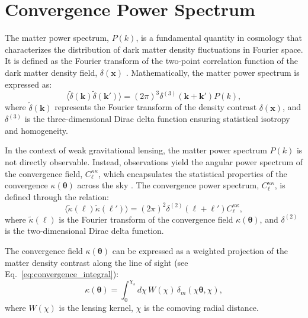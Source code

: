 \section{Convergence Power Spectrum}
The matter power spectrum, \( P(k) \), is a fundamental quantity in cosmology that characterizes the distribution of dark matter density fluctuations in Fourier space. It is defined as the Fourier transform of the two-point correlation function of the dark matter density field, \( \delta(\mathbf{x}) \) \citep{2001PhR...340..291B}. Mathematically, the matter power spectrum is expressed as:
\begin{equation}
    \langle \tilde{\delta}(\mathbf{k}) \tilde{\delta}(\mathbf{k}') \rangle = (2\pi)^3 \delta^{(3)}(\mathbf{k} + \mathbf{k}') P(k),
    \label{eq:matter_power_spectrum}
\end{equation}
where \( \tilde{\delta}(\mathbf{k}) \) represents the Fourier transform of the density contrast \( \delta(\mathbf{x}) \), and \( \delta^{(3)} \) is the three-dimensional Dirac delta function ensuring statistical isotropy and homogeneity.

In the context of weak gravitational lensing, the matter power spectrum \( P(k) \) is not directly observable. Instead, observations yield the angular power spectrum of the convergence field, \( C_{\ell}^{\kappa\kappa} \), which encapsulates the statistical properties of the convergence \( \kappa(\boldsymbol{\theta}) \) across the sky \citep{2001PhR...340..291B}. The convergence power spectrum, \( C_{\ell}^{\kappa\kappa} \), is defined through the relation:
\begin{equation}
    \langle \tilde{\kappa}(\boldsymbol{\ell}) \tilde{\kappa}(\boldsymbol{\ell}') \rangle = (2\pi)^2 \delta^{(2)}(\boldsymbol{\ell} + \boldsymbol{\ell}') C^{\kappa\kappa}_\ell,
    \label{eq:convergence_power_spectrum}
\end{equation}
where \( \tilde{\kappa}(\boldsymbol{\ell}) \) is the Fourier transform of the convergence field \( \kappa(\boldsymbol{\theta}) \), and \( \delta^{(2)} \) is the two-dimensional Dirac delta function.

The convergence field \( \kappa(\boldsymbol{\theta}) \) can be expressed as a weighted projection of the matter density contrast along the line of sight (see Eq.~\eqref{eq:convergence_integral}):
\begin{equation}
    \kappa(\boldsymbol{\theta}) = \int_0^{\chi_s} d\chi \, W(\chi) \, \delta_m\left(\chi \boldsymbol{\theta}, \chi\right),
    \label{eq:kappa_projection}
\end{equation}
where \( W(\chi) \) is the lensing kernel, \( \chi \) is the comoving radial distance.

